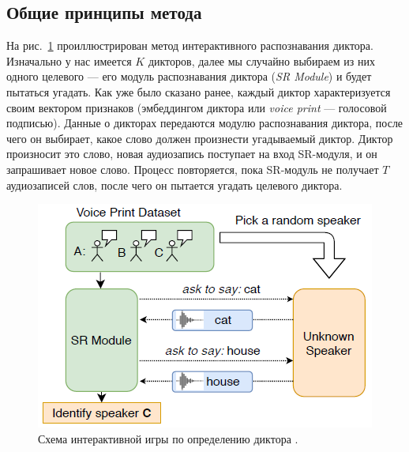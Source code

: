 \subsection{Общие принципы метода}\label{ssec:isr}

На рис.~\ref{fig:isr} проиллюстрирован метод интерактивного распознавания
диктора. Изначально у нас имеется $K$ дикторов, далее мы случайно выбираем из
них одного целевого --- его модуль распознавания диктора (\textit{SR Module}) и
будет пытаться угадать. Как уже было сказано ранее, каждый диктор
характеризуется своим вектором признаков (эмбеддингом диктора или \textit{voice
print} --- голосовой подписью). Данные о дикторах передаются модулю
распознавания диктора, после чего он выбирает, какое слово должен произнести
угадываемый диктор. Диктор произносит это слово, новая аудиозапись поступает на
вход SR-модуля, и он запрашивает новое слово.  Процесс повторяется, пока
SR-модуль не получает $T$ аудиозаписей слов, после чего он пытается угадать
целевого диктора.

\begin{figure}[hbt]
    \centering
    \includegraphics[scale=1.0]{figures/isr_game.png}
    \caption{Схема интерактивной игры по определению диктора \citeisr.}
    \label{fig:isr}
\end{figure}

